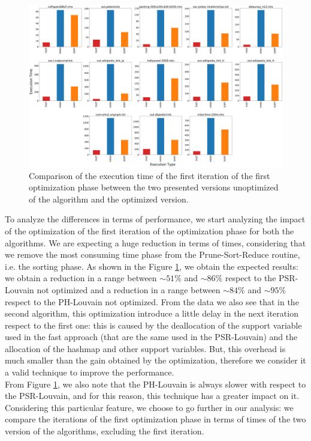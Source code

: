 \begin{figure}[t!]
	\centering
	\includegraphics[width=1\linewidth]{0-resources/first-hash-sort}
	\caption{Comparison of the execution time of the first iteration of the first optimization phase between the two presented versions unoptimized of the algorithm and the optimized version.}
	\label{fig:first-hash-sort}
\end{figure}
To analyze the differences in terms of performance, we start analyzing the impact of the optimization of the first iteration of the optimization phase for both the algorithms. We are expecting a huge reduction in terms of times, considering that we remove the most consuming time phase from the Prune-Sort-Reduce routine, i.e. the sorting phase. As shown in the Figure \ref{fig:first-hash-sort}, we obtain the expected results: we obtain a reduction in a range between $\sim 51\%$ and $\sim 86\%$ respect to the PSR-Louvain not optimized and a reduction in a range between $\sim 84\%$ and $\sim 95\%$ respect to the PH-Louvain not optimized. From the data we also see that in the second algorithm, this optimization introduce a little delay in the next iteration respect to the first one: this is caused by the deallocation of the support variable used in the fast approach (that are the same used in the PSR-Louvain) and the allocation of the hashmap and other support variables. But, this overhead is much smaller than the gain obtained by the optimization, therefore we consider it a valid technique to improve the performance.\\
From Figure \ref{fig:first-hash-sort}, we also note that the PH-Louvain is always slower with respect to the PSR-Louvain, and for this reason, this technique has a greater impact on it. Considering this particular feature, we choose to go further in our analysis: we compare the iterations of the first optimization phase in terms of times of the two version of the algorithms, excluding the first iteration.
